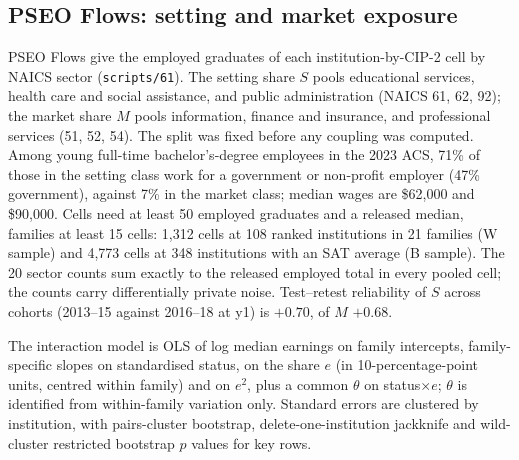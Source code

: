 \documentclass[11pt]{article}
\newcommand{\scr}[1]{\texttt{scripts/#1}}
\begin{document}
\subsection{PSEO Flows: setting and market exposure}\label{sec:flows}

PSEO Flows give the employed graduates of each institution-by-CIP-2 cell by NAICS sector (\scr{61}). The setting share $S$
pools educational services, health care and social assistance, and public administration (NAICS 61, 62, 92); the market
share $M$ pools information, finance and insurance, and professional services (51, 52, 54). The split was fixed before any
coupling was computed. Among young full-time bachelor's-degree employees in the 2023 ACS, 71\% of those in the setting class
work for a government or non-profit employer (47\% government), against 7\% in the market class; median wages are \$62,000
and \$90,000. Cells need at least 50 employed graduates and a released median, families at least 15 cells: 1,312 cells at 108
ranked institutions in 21 families (W sample) and 4,773 cells at 348 institutions with an SAT average (B sample). The
20 sector counts sum exactly to the released employed total in every pooled cell; the counts carry differentially private
noise. Test--retest reliability of $S$ across cohorts (2013--15 against 2016--18 at y1) is $+0.70$, of $M$ $+0.68$.

The interaction model is OLS of log median earnings on family intercepts, family-specific slopes on standardised status,
on the share $e$ (in 10-percentage-point units, centred within family) and on $e^2$, plus a common $\theta$ on
status$\times e$; $\theta$ is identified from within-family variation only. Standard errors are clustered by institution, with
pairs-cluster bootstrap, delete-one-institution jackknife and wild-cluster restricted bootstrap $p$ values for key rows.
\end{document}
